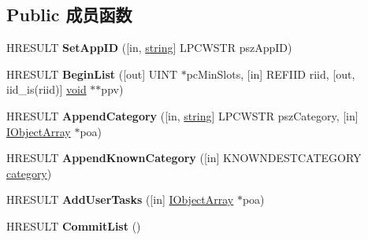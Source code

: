 \subsection*{Public 成员函数}
\begin{DoxyCompactItemize}
\item 
\mbox{\label{interface_i_custom_destination_list_a68ae002ff5fd480a6051f2476d72acde}} 
H\+R\+E\+S\+U\+LT {\bfseries Set\+App\+ID} (\mbox{[}in, \hyperlink{structstring}{string}\mbox{]} L\+P\+C\+W\+S\+TR psz\+App\+ID)
\item 
\mbox{\label{interface_i_custom_destination_list_a1250349d9c100d2532d0aefa8c04e8ee}} 
H\+R\+E\+S\+U\+LT {\bfseries Begin\+List} (\mbox{[}out\mbox{]} U\+I\+NT $\ast$pc\+Min\+Slots, \mbox{[}in\mbox{]} R\+E\+F\+I\+ID riid, \mbox{[}out, iid\+\_\+is(riid)\mbox{]} \hyperlink{interfacevoid}{void} $\ast$$\ast$ppv)
\item 
\mbox{\label{interface_i_custom_destination_list_add4f462bfd1784995a40b2b55781ced2}} 
H\+R\+E\+S\+U\+LT {\bfseries Append\+Category} (\mbox{[}in, \hyperlink{structstring}{string}\mbox{]} L\+P\+C\+W\+S\+TR psz\+Category, \mbox{[}in\mbox{]} \hyperlink{interface_i_object_array}{I\+Object\+Array} $\ast$poa)
\item 
\mbox{\label{interface_i_custom_destination_list_a1d3e5b9f841c5a29da0c3e3b5519151e}} 
H\+R\+E\+S\+U\+LT {\bfseries Append\+Known\+Category} (\mbox{[}in\mbox{]} K\+N\+O\+W\+N\+D\+E\+S\+T\+C\+A\+T\+E\+G\+O\+RY \hyperlink{structcategory}{category})
\item 
\mbox{\label{interface_i_custom_destination_list_a1db986eee1b89277f1dcbc617b25e7a0}} 
H\+R\+E\+S\+U\+LT {\bfseries Add\+User\+Tasks} (\mbox{[}in\mbox{]} \hyperlink{interface_i_object_array}{I\+Object\+Array} $\ast$poa)
\item 
\mbox{\label{interface_i_custom_destination_list_ab33e3c53cb3b4b83b0108681c3c51660}} 
H\+R\+E\+S\+U\+LT {\bfseries Commit\+List} ()
\item 
\mbox{\label{interface_i_custom_destination_list_a94998118ca587a06fce76d85ba620a60}} 
$$
\end{DoxyCompactItemize}
